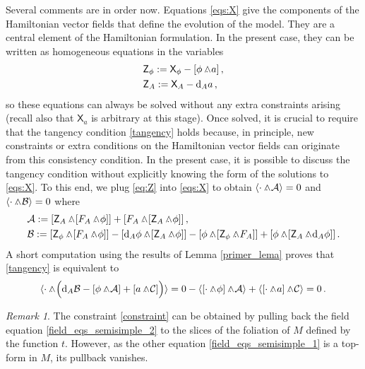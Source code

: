 \documentclass[12pt]{amsart}
\theoremstyle{plain}
\theoremstyle{definition}
\theoremstyle{remark}
\newtheorem{remark}[theorem]{Remark}
\newcommand{\wed}{\wedge\hspace*{-7.5pt}.\hspace*{3pt}}
\numberwithin{equation}{section}  %
\begin{document}
Several comments are in order now. Equations \eqref{eqs:X} give the components of the Hamiltonian vector fields that define the evolution of the model. They are a central element of the Hamiltonian formulation. In the present case, they can be written as homogeneous equations in the variables
\begin{subequations}\label{eq:Z}
\begin{align}
&\mathsf{Z}_\phi:=\mathsf{X}_\phi-[\phi\wed a]\,,\\
&\mathsf{Z}_A:=\mathsf{X}_A-\mathrm{d}_Aa\,,
\end{align}
\end{subequations}
so these equations can always be solved without any extra constraints arising (recall also that $\mathsf{X}_a$ is arbitrary at this stage). Once solved, it is crucial to require that the tangency condition \eqref{tangency} holds because, in principle, new constraints or extra conditions on the Hamiltonian vector fields can originate from this consistency condition. In the present case, it is possible to discuss the tangency condition without explicitly knowing the form of the solutions to \eqref{eqs:X}. To this end, we plug \eqref{eq:Z} into  \eqref{eqs:X} to obtain $\langle\cdot \wed \mathcal{A}\rangle=0$ and $\langle\cdot\wed \mathcal{B}\rangle=0$ where
\begin{subequations}
\begin{align}
  & \mathcal{A}:= [\mathsf{Z}_A\wed[F_A\wed\phi]]+[F_A\wed[\mathsf{Z}_A\wed\phi]]\,,\label{eeq1}\\
  & \mathcal{B}:= [\mathsf{Z}_\phi\wed [F_A\wed\phi]]-[\mathrm{d}_A\phi\wed[\mathsf{Z}_A\wed\phi ]]-[\phi\wed[\mathsf{Z}_\phi\wed F_A]] +[\phi\wed[\mathsf{Z}_A\wed \mathrm{d}_A\phi]]\label{eeq2}\,.
\end{align}
\end{subequations}
A short computation using the results of Lemma \ref{primer_lema} proves that \eqref{tangency} is equivalent to 
\begin{equation}
    \langle\cdot\wed\Big(\mathrm{d}_A\mathcal{B}-[\phi\wed\mathcal{A}]+[a\wed\mathcal{C}]\Big)\rangle=0-\langle[\cdot\wed\phi]\wed \mathcal{A}\rangle+\langle[\cdot\wed a]\wed\mathcal{C}\rangle=0\,.
\end{equation}
\begin{remark}
    The constraint \eqref{constraint} can be obtained by pulling back the field equation \eqref{field_eqs_semisimple_2} to the slices of the foliation of $M $ defined by the function $t$. However, as the other equation \eqref{field_eqs_semisimple_1} is a top-form in $M$, its pullback vanishes.
\end{remark}
\end{document}
